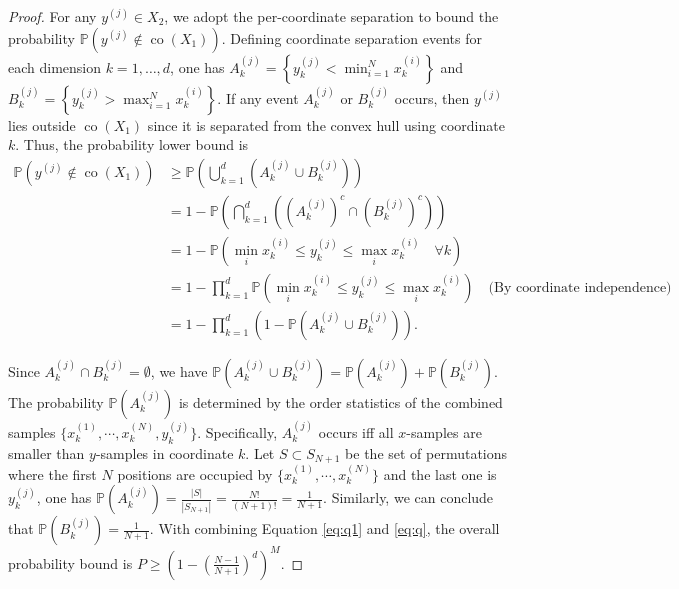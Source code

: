 \documentclass[journal]{IEEEtran}
\begin{document}
{\begin{proof}
For any $y^{(j)}  \in X_2$, we adopt the per-coordinate separation to bound the probability $\mathbb{P}\left( y^{(j)} \notin  \operatorname{co}(X_1) \right)$. Defining coordinate separation events for each dimension $k = 1, \dots, d$, one has $A_k^{(j)} = \left\{ y_k^{(j)} < \min_{i=1}^N x_k^{(i)} \right\}$ and $B_k^{(j)} = \left\{ y_k^{(j)} > \max_{i=1}^N x_k^{(i)} \right\}$. If any event $A_k^{(j)}$ or $B_k^{(j)}$ occurs, then $y^{(j)}$ lies outside $\operatorname{co}(X_1)$ since it is separated from the convex hull using coordinate $k$. Thus, the probability lower bound is  
\begin{align}
	\mathbb{P}\left(y^{(j)} \notin \operatorname{co}(X_1)\right) & \geq \mathbb{P}\left( \bigcup_{k=1}^d \left( A_k^{(j)} \cup B_k^{(j)} \right) \right) \nonumber \\
	&= 1 - \mathbb{P}\left( \bigcap_{k=1}^d \left( (A_k^{(j)})^c \cap (B_k^{(j)})^c \right) \right) \nonumber\\
   & =1 - \mathbb{P}\left( \min_i x_k^{(i)} \leq y_k^{(j)} \leq \max_i x_k^{(i)} \quad \forall k \right)  \nonumber \\
	& = 1 - \prod_{k=1}^d \mathbb{P}\left( \min_i x_k^{(i)} \leq y_k^{(j)} \leq \max_i x_k^{(i)} \right) \quad \text{(By coordinate independence)} \nonumber\\
	& = 1 - \prod_{k=1}^d \left(1 -  \mathbb{P}\left( A_k^{(j)} \cup B_k^{(j)} \right)\right). \label{eq:q1}
\end{align} 

Since $A_k^{(j)} \cap B_k^{(j)} = \emptyset$, we have $\mathbb{P}\left( A_k^{(j)} \cup B_k^{(j)} \right) = \mathbb{P}\left( A_k^{(j)} \right)+ \mathbb{P}\left( B_k^{(j)}\right) $. The probability $\mathbb{P}\left( A_k^{(j)} \right)$ is determined by the order statistics of the combined samples $\{x_k^{(1)}, \cdots,x_k^{(N)},y_k^{(j)} \}$. Specifically, $A_k^{(j)}$ occurs iff all $x$-samples are smaller than $y$-samples in coordinate $k$. Let $S \subset S_{N+1}$ be the set of permutations where the first $N$ positions are occupied by $\{x_k^{(1)}, \cdots,x_k^{(N)} \}$ and the last one is $y_k^{(j)}$, one has $\mathbb{P}\left( A_k^{(j)} \right) =\frac{|S|}{|S_{N+1}|} =\frac{N!}{(N+1)!}=\frac{1}{N+1}$. Similarly, we can conclude that $\mathbb{P}\left( B_k^{(j)} \right) = \frac{1}{N+1}$.  With combining Equation \eqref{eq:q1} and \eqref{eq:q}, the overall probability bound is $P \geq \left( 1 - \left( \frac{N-1}{N+1} \right)^d \right)^M$.
\end{proof}




}
\end{document}
